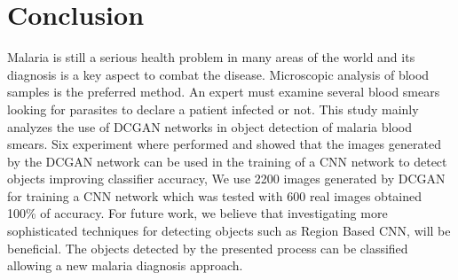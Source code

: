 \section{Conclusion}

Malaria is still a serious health problem in many areas of the world and its diagnosis is a key aspect to combat the disease. Microscopic analysis of blood samples is the preferred method. An expert must examine several blood smears looking for parasites to declare a patient infected or not. 
This study mainly analyzes the use of DCGAN networks in object detection of malaria blood smears. Six experiment where performed and  showed that the images generated by the DCGAN network can be used in the training of a CNN network to detect objects improving classifier accuracy, We use 2200 images generated by DCGAN for training a CNN network which was tested with 600 real images obtained 100\% of accuracy. For future work, we believe that investigating more sophisticated techniques for detecting objects such as Region Based CNN, will be beneficial. The objects detected by the presented process can be classified allowing a new malaria diagnosis approach.